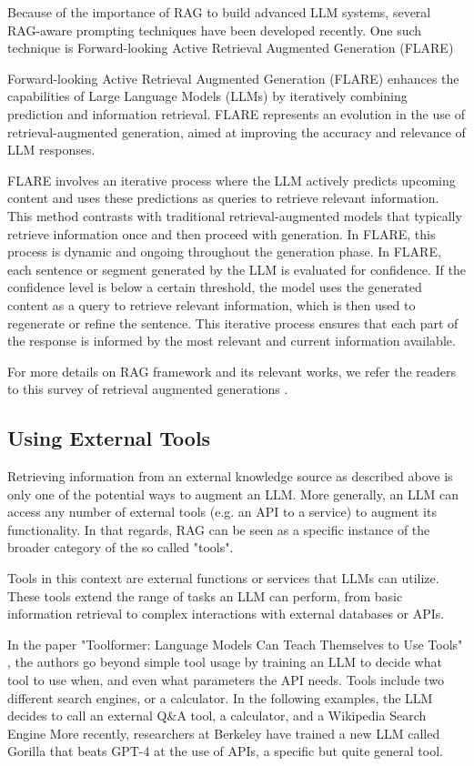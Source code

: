 \documentclass[conference]{IEEEtran}
\begin{document}
Because of the importance of RAG to build advanced LLM systems, several RAG-aware prompting techniques have been developed recently. One such technique is Forward-looking Active Retrieval Augmented Generation (FLARE)

Forward-looking Active Retrieval Augmented Generation (FLARE) \cite{jiang2023active} enhances the capabilities of Large Language Models (LLMs) by iteratively combining prediction and information retrieval. FLARE represents an evolution in the use of retrieval-augmented generation, aimed at improving the accuracy and relevance of LLM responses.

FLARE involves an iterative process where the LLM actively predicts upcoming content and uses these predictions as queries to retrieve relevant information. This method contrasts with traditional retrieval-augmented models that typically retrieve information once and then proceed with generation. In FLARE, this process is dynamic and ongoing throughout the generation phase. In FLARE, each sentence or segment generated by the LLM is evaluated for confidence. If the confidence level is below a certain threshold, the model uses the generated content as a query to retrieve relevant information, which is then used to regenerate or refine the sentence. This iterative process ensures that each part of the response is informed by the most relevant and current information available.

For more details on RAG framework and its relevant works, we refer the readers to this survey of retrieval augmented generations 
 \cite{gao2023retrieval}. 


\subsection{\textbf{Using External Tools}}

Retrieving information from an external knowledge source as described above is only one of the potential ways to augment an LLM. More generally, an LLM can access any number of external tools (e.g. an API to a service) to augment its functionality. In that regards, RAG can be seen as a specific instance of the broader category of the so called "tools".

Tools in this context are external functions or services that LLMs can utilize. These tools extend the range of tasks an LLM can perform, from basic information retrieval to complex interactions with external databases or APIs.

In the paper "Toolformer: Language Models Can Teach Themselves to Use Tools" 
\cite{schick2023toolformer}, the authors go beyond simple tool usage by training an LLM to decide what tool to use when, and even what parameters the API needs. Tools include two different search engines, or a calculator. In the following examples, the LLM decides to call an external Q\&A tool, a calculator, and a Wikipedia Search Engine More recently, researchers at Berkeley have trained a new LLM called Gorilla \cite{patil2023gorilla} that beats GPT-4 at the use of APIs, a specific but quite general tool.
\end{document}
